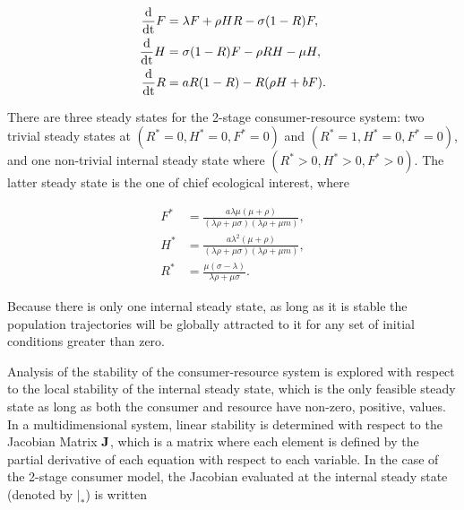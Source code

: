 \documentclass[12pt,english]{article}
\begin{document}
\begin{spacing}{1.9}
\begin{align}
\frac{\rm d}{\rm dt} F &= \lambda F + \rho HR - \sigma (1-R)F, \nonumber \\
\frac{\rm d}{\rm dt} H &= \sigma (1-R)F - \rho RH - \mu H, \nonumber \\
\frac{\rm d}{\rm dt} R &= a R(1-R) - R(\rho H+ b F).
\label{eq_specific}
\end{align}

There are three steady states for the 2-stage consumer-resource system: two trivial steady states at $(R^*=0,H^*=0,F^*=0)$ and $(R^*=1,H^*=0,F^*=0)$, and one non-trivial internal steady state where $(R^*>0,H^*>0,F^*>0)$.
The latter steady state is the one of chief ecological interest, where

\begin{align}
F^* &= \frac{a  \lambda  \mu  (\mu +\rho )}{(\lambda  \rho +\mu  \sigma ) (\lambda  \rho +\mu  m)}, \nonumber \\
H^* &= \frac{a  \lambda ^2 (\mu +\rho )}{(\lambda  \rho +\mu  \sigma ) (\lambda  \rho +\mu  m)}, \nonumber \\
R^* &= \frac{\mu  (\sigma -\lambda )}{\lambda  \rho +\mu  \sigma }.
\end{align}

\noindent Because there is only one internal steady state, as long as it is stable the population trajectories will be globally attracted to it for any set of initial conditions greater than zero.

Analysis of the stability of the consumer-resource system is explored with respect to the local stability of the internal steady state, which is the only feasible steady state as long as both the consumer and resource have non-zero, positive, values.
In a multidimensional system, linear stability is determined with respect to the Jacobian Matrix $\bf J$, which is a matrix where each element is defined by the partial derivative of each equation with respect to each variable.
In the case of the 2-stage consumer model, the Jacobian evaluated at the internal steady state (denoted by $|_*$) is written


\end{spacing}
\end{document}
